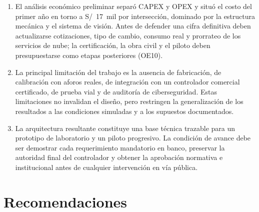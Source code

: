 \begin{enumerate}
\item El análisis económico preliminar separó CAPEX y OPEX y situó el costo del primer año en torno a
S/~17~mil por intersección, dominado por la estructura mecánica y el sistema de visión. Antes de defender
una cifra definitiva deben actualizarse cotizaciones, tipo de cambio, consumo real y prorrateo de los
servicios de nube; la certificación, la obra civil y el piloto deben presupuestarse como etapas posteriores
(OE10).

\item La principal limitación del trabajo es la ausencia de fabricación, de calibración con aforos reales,
de integración con un controlador comercial certificado, de prueba vial y de auditoría de ciberseguridad.
Estas limitaciones no invalidan el diseño, pero restringen la generalización de los resultados a las
condiciones simuladas y a los supuestos documentados.

\item La arquitectura resultante constituye una base técnica trazable para un prototipo de laboratorio y un
piloto progresivo. La condición de avance debe ser demostrar cada requerimiento mandatorio en banco,
preservar la autoridad final del controlador y obtener la aprobación normativa e institucional antes de
cualquier intervención en vía pública.
\end{enumerate}

\section*{Recomendaciones}

